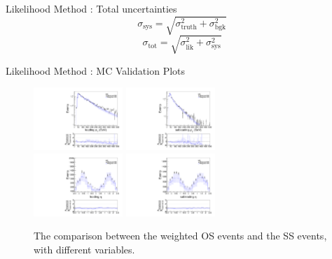 \documentclass[mathserif,serif]{beamer}
\begin{document}
\begin{frame}{Likelihood Method : Total uncertainties}
\begin{equation*}
\sigma_{\text{sys}} = \sqrt{\sigma_{\text{truth}} ^2 + \sigma_{\text{bgk}} ^2}
\end{equation*}
\begin{equation*}
\sigma_{\text{tot}} = \sqrt{\sigma_{\text{lik}} ^2 + \sigma_{\text{sys}} ^2}
\end{equation*}
\end{frame}

\begin{frame}{Likelihood Method : MC Validation Plots}
\begin{figure}
\centering
\includegraphics[width=0.3\textwidth]{data/plot/charge_flip/ReweightPlots/plots_NOchfSF/mc_pt_1.pdf}
\includegraphics[width=0.3\textwidth]{data/plot/charge_flip/ReweightPlots/plots_NOchfSF/mc_pt_2.pdf} \\
\includegraphics[width=0.3\textwidth]{data/plot/charge_flip/ReweightPlots/plots_NOchfSF/mc_eta_1.pdf}
\includegraphics[width=0.3\textwidth]{data/plot/charge_flip/ReweightPlots/plots_NOchfSF/mc_eta_2.pdf}
\caption{The comparison between the weighted OS events and the SS events, with different variables.}
\end{figure}
\end{frame}
\end{document}
